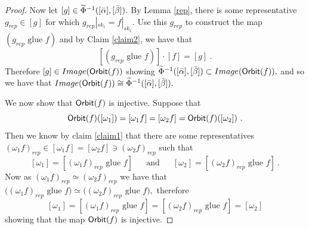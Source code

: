 \begin{proof}
\noindent Now let $[g] \in \widetilde{\Phi}^{-1}([\bar{\alpha}] , [\bar{\beta}]).$ By Lemma \ref{rep}, there is some representative $g_{rep} \in [g]$ for which $g_{rep}|_{sk_{1}} = f|_{sk_{1}}.$ Use this $g_{rep}$ to construct the map $(g_{rep} \text{ glue } f)$ and by Claim \ref{claim2}, we have that
\[
[(g_{rep}  \text{ glue } f)] \cdot [f]  = [g]~.
\]
Therefore $[g] \in Image({\sf Orbit}(f))$ showing $\widetilde{\Phi}^{-1}([\bar{\alpha}] ,[\bar{\beta}]) \subset Image({\sf Orbit}(f)),$ and so we have that $Image({\sf Orbit}(f)) \cong \widetilde{\Phi}^{-1}([\bar{\alpha}] ,[\bar{\beta}]).$ 
\newline \newline


\noindent We now show that ${\sf Orbit}(f)$ is injective.
Suppose that \[{\sf Orbit}(f)([\omega_{1}]) = [\omega_{1}f] = [\omega_{2}f]= {\sf Orbit}(f)([\omega_{2}])~.\] Then we know by claim \ref{claim1} that there are some representatives $(\omega_{1}f)_{rep} \in [\omega_{1}f] =[ \omega_{2}f] \ni (\omega_{2}f)_{rep} $ such that
\[
[\omega_{1}] = [(\omega_{1}f)_{rep} \text{ glue } f]
\hspace{15pt}
\text{ and }  
\hspace{15pt}
[\omega_{2}] = [(\omega_{2}f)_{rep} \text{ glue } f]~.
\]
Now as $(\omega_{1}f)_{rep} \simeq (\omega_{2}f)_{rep}$ we have that $\big((\omega_{1}f)_{rep} \text{ glue } f\big) \simeq \big((\omega_{2}f)_{rep} \text{ glue } f\big),$ therefore
\[
[\omega_{1}] = [(\omega_{1}f)_{rep} \text{ glue } f] = [(\omega_{2}f)_{rep} \text{ glue } f] = [\omega_{2}]  
\]
 showing that the map ${\sf Orbit}(f)$ is injective.
\end{proof}



